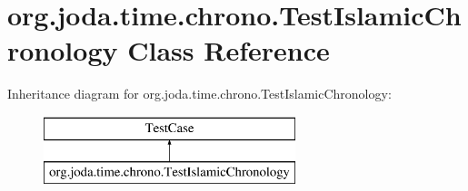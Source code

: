 \hypertarget{classorg_1_1joda_1_1time_1_1chrono_1_1_test_islamic_chronology}{\section{org.\-joda.\-time.\-chrono.\-Test\-Islamic\-Chronology Class Reference}
\label{classorg_1_1joda_1_1time_1_1chrono_1_1_test_islamic_chronology}
}
Inheritance diagram for org.\-joda.\-time.\-chrono.\-Test\-Islamic\-Chronology\-:\begin{figure}[H]
\begin{center}
\leavevmode
\includegraphics[height=2.000000cm]{classorg_1_1joda_1_1time_1_1chrono_1_1_test_islamic_chronology}
\end{center}
\end{figure}
